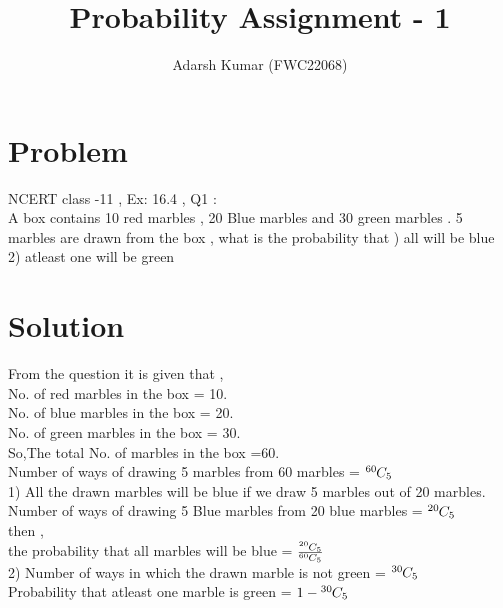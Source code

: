 \documentclass[journal,12pt,twocolumn]{IEEEtran}
\title{\mytitle}
\title
{ Probability Assignment - 1
}
\author{Adarsh Kumar (FWC22068)}
\newcommand*{\comb}[1][-1mu]{\permcomb[#1]{C}}
\newcommand*{\permcomb}[4][0mu]{{{}^{#3}\mkern#1#2_{#4}}}
\begin{document}
\maketitle
\tableofcontents
\bigskip


\section{Problem}
NCERT class -11 , Ex: 16.4 , Q1 :\\
A box contains 10 red marbles , 20 Blue marbles and 30 green marbles . 5 marbles are drawn from the box , what is the probability that 
) all will be blue 
\\
2) atleast one will be green 
\\

\section{Solution}
From the question it is given that ,
\\
No. of red marbles in the box = 10.
\\
No. of blue marbles in the box = 20.
\\
No. of green marbles in the box = 30.
\\
So,The total No. of marbles in the box =60.\\
Number of ways of drawing 5 marbles from 60 marbles = $\comb{60}{5}$ 
\\
1) All the drawn marbles will be blue if we draw 5 marbles out of 20 marbles.
\\
Number of ways of drawing 5 Blue marbles from 20 blue marbles = $ \comb{20}{5}$
\\
then , 
\\
the probability that all marbles will be blue = $ \frac{\comb{20}{5}}{\comb{60}{5}} $    
\\
2) Number of ways in which the drawn marble is not green = $\comb{30}{5}$
\\
Probability that atleast one marble is green = $1 - \comb{30}{5}$
\end{document}
